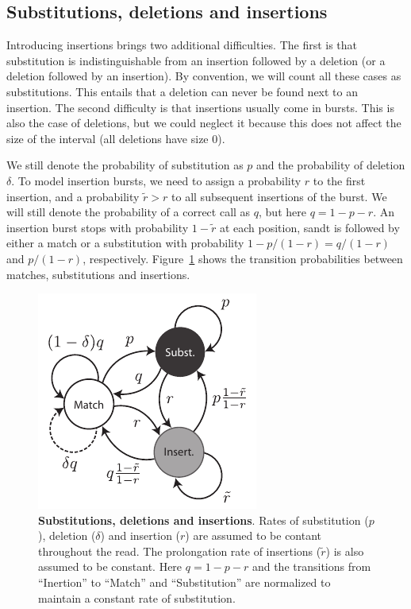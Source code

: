 \documentclass{article}
\begin{document}
\subsection{Substitutions, deletions and insertions}
\label{sec:insertions}

Introducing insertions brings two additional difficulties. The first is
that substitution is indistinguishable from an insertion followed by a
deletion (or a deletion followed by an insertion). By convention, we will
count all these cases as substitutions. This entails that a deletion can
never be found next to an insertion. The second difficulty is that
insertions usually come in bursts. This is also the case of deletions, but
we could neglect it because this does not affect the size of the interval
(all deletions have size $0$). 

We still denote the probability of substitution as $p$ and the probability
of deletion $\delta$. To model insertion bursts, we need to assign a
probability $r$ to the first insertion, and a probability $\tilde{r} > r$
to all subsequent insertions of the burst. We will still denote the
probability of a correct call as $q$, but here $q = 1-p-r$.  An insertion
burst stops with probability $1-\tilde{r}$ at each position, sandt is
followed by either a match or a substitution with probability $1-p/(1-r) =
q/(1-r)$ and $p/(1-r)$, respectively. Figure~\ref{fig:insertions} shows
the transition probabilities between matches, substitutions and
insertions.

\begin{figure}[h]
\centering
\includegraphics[scale=0.9]{insertions.pdf}
\caption{\textbf{Substitutions, deletions and insertions}. Rates of
substitution ($p$), deletion ($\delta$) and insertion ($r$) are assumed to
be contant throughout the read. The prolongation rate of insertions
($\tilde{r}$) is also assumed to be constant. Here $q = 1-p-r$ and the
transitions from ``Inertion'' to ``Match'' and ``Substitution'' are
normalized to maintain a constant rate of substitution.}
\label{fig:insertions}
\end{figure}
\end{document}
